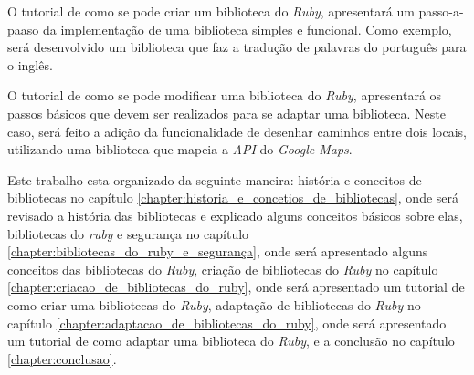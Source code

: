 O tutorial de como se pode criar um biblioteca do \emph{Ruby}, apresentará
um passo-a-paaso da implementação de uma biblioteca simples e funcional. Como exemplo,
será desenvolvido um biblioteca que faz a tradução de palavras do português para o inglês.

O tutorial de como se pode modificar uma biblioteca do \emph{Ruby}, apresentará
os passos básicos que devem ser realizados para se adaptar uma biblioteca. Neste caso, será
feito a adição da funcionalidade de desenhar caminhos entre dois locais, utilizando uma
biblioteca que mapeia a \emph{API} do \emph{Google Maps}. 

Este trabalho esta organizado da seguinte maneira: história e conceitos de
bibliotecas no capítulo \ref{chapter:historia_e_concetios_de_bibliotecas}, onde será
revisado a história das bibliotecas e explicado alguns conceitos básicos sobre elas,
bibliotecas do \emph{ruby} e segurança no capítulo \ref{chapter:bibliotecas_do_ruby_e_segurança},
onde será apresentado alguns conceitos das bibliotecas do \emph{Ruby}, criação de
bibliotecas do \emph{Ruby} no capítulo 
\ref{chapter:criacao_de_bibliotecas_do_ruby}, onde será apresentado
um tutorial de como criar uma bibliotecas do \emph{Ruby}, adaptação de
bibliotecas do \emph{Ruby} no capítulo 
\ref{chapter:adaptacao_de_bibliotecas_do_ruby}, onde será apresentado
um tutorial de como adaptar uma biblioteca do \emph{Ruby}, e a
conclusão no capítulo \ref{chapter:conclusao}.